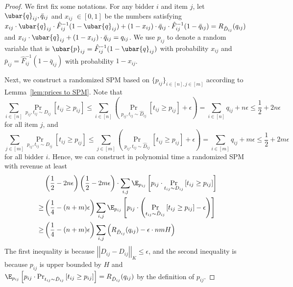 \begin{proof}
	We first fix some notations. For any bidder $i$ and item $j$, let $\ubar{q}_{ij}, \bar{q}_{ij}$ and $x_{ij}$ $\in[0,1]$ be the numbers satisfying $x_{ij}\cdot \ubar{q}_{ij}\cdot \hat{F}_{ij}^{-1}(1-\ubar{q}_{ij}) +(1-x_{ij})\cdot \bar{q}_{ij}\cdot \hat{F}_{ij}^{-1}(1-\bar{q}_{ij})=R_{\hat{D}_{ij}}(q_{ij})$ and $x_{ij}\cdot \ubar{q}_{ij} +(1-x_{ij})\cdot \bar{q}_{ij}=q_{ij}$. We use $p_{ij}$ to denote a random variable that is $\ubar{p}_{ij} = \hat{F}_{ij}^{-1}(1-\ubar{q}_{ij})$ with probability $x_{ij}$ and $\bar{p}_{ij} = \hat{F}_{ij}^{-1}(1-\bar{q}_{ij})$ with probability $1-x_{ij}$.  
	
	Next, we construct a randomized SPM based on $\{p_{ij}\}_{i\in[n],j\in[m]}$ according to Lemma~\ref{lem:prices to SPM}. Note that $$\sum_{i\in[n]} \Pr_{p_{ij}, t_{ij}\sim D_{ij}}\left[t_{ij}\geq p_{ij}\right]\leq \sum_{i\in[n]} \left(\Pr_{p_{ij}, t_{ij}\sim \hat{D}_{ij}}\left[t_{ij}\geq p_{ij}\right]+\epsilon\right)=\sum_{i\in[n]} q_{ij}+n\epsilon\leq \frac{1}{2}+2n\epsilon$$ for all item $j$, and $$\sum_{j\in[m]} \Pr_{p_{ij}, t_{ij}\sim D_{ij}}\left[t_{ij}\geq p_{ij}\right]\leq \sum_{j\in[m]} \left(\Pr_{p_{ij}, t_{ij}\sim \hat{D}_{ij}}\left[t_{ij}\geq p_{ij}\right]+\epsilon\right)=\sum_{i\in[m]} q_{ij}+m\epsilon\leq \frac{1}{2}+2m\epsilon$$ for all bidder $i$. Hence, we can construct in polynomial time a randomized SPM with revenue at least \begin{align*} &\left(\frac{1}{2}-2n\epsilon\right)\left(\frac{1}{2}-2m\epsilon\right)\cdot \sum_{i, j} \E_{p_{ij}}\left[p_{ij}\cdot \Pr_{t_{ij}\sim D_{ij}}\left[t_{ij}\geq p_{ij}\right]\right]\\
 	\geq &  \left(\frac{1}{4}-(n+m)\epsilon\right)\sum_{i, j} \E_{p_{ij}}\left[p_{ij}\cdot \left(\Pr_{t_{ij}\sim \hat{D}_{ij}}\left[t_{ij}\geq p_{ij}\right]-\epsilon\right)\right]\\
 	\geq & \left(\frac{1}{4}-(n+m)\epsilon\right)\sum_{i, j} \left(R_{\hat{D}_{ij}}(q_{ij})-\epsilon\cdot nmH\right)
 \end{align*}
	The first inequality is because $\left|\left|D_{ij}-\hat{D}_{ij}\right|\right|_K\leq \epsilon$, and the second inequality is because $p_{ij}$ is upper bounded by $H$ and $\E_{p_{ij}}\left[p_{ij}\cdot \Pr_{t_{ij}\sim \hat{D}_{ij}}\left[t_{ij}\geq p_{ij}\right]\right]=R_{\hat{D}_{ij}}(q_{ij})$ by the definition of $p_{ij}$.
	

\end{proof}
